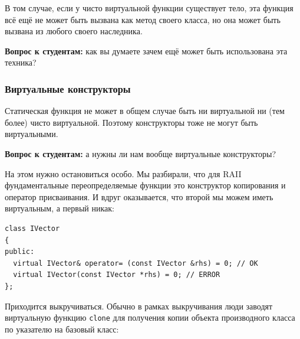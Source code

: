 \documentclass[a4paper,12pt,oneside]{article}
\newif\ifanswers
\begin{document}
В том случае, если у чисто виртуальной функции существует тело, эта функция всё ещё не может быть вызвана как метод своего класса, но она может быть вызвана из любого своего наследника.

\textbf{Вопрос к студентам:} как вы думаете зачем ещё может быть использована эта техника?

\ifanswers
Возможный ответ: для организации разумного поведения по умолчанию, которое наследники должны явно вызывать:

\begin{lstlisting}
class B 
{
public:
  virtual bool f() = 0;
};

bool 
B::f() 
{
  return true;  // this is a good default, but
}               // shouldn't be used blindly

class D : public B 
{
public:
  bool f() 
  {
    return B::f(); // if D wants the default
  }                // behaviour, it has to say so
};
\end{lstlisting}

Но тут возможны и другие варианты: например выдать лучшее сообщение об ошибке чем компилятор и выйти.
\fi

\subsubsection{Виртуальные конструкторы}

Статическая функция не может в общем случае быть ни виртуальной ни (тем более) чисто виртуальной. Поэтому конструкторы тоже не могут быть виртуальными.

\textbf{Вопрос к студентам:} а нужны ли нам вообще виртуальные конструкторы?

\ifanswers
Правильный ответ: да очень нужны. Скажем виртуальный конструктор копирования позволил бы создать в явном виде объект производного класса по указателю на объект базового класса
\fi

На этом нужно остановиться особо. Мы разбирали, что для RAII фундаментальные переопределяемые функции это конструктор копирования и оператор присваивания. И вдруг оказывается, что второй мы можем иметь виртуальным, а первый никак:

\begin{lstlisting}
class IVector
{
public:
  virtual IVector& operator= (const IVector &rhs) = 0; // OK
  virtual IVector(const IVector *rhs) = 0; // ERROR
};
\end{lstlisting}

Приходится выкручиваться. Обычно в рамках выкручивания люди заводят виртуальную функцию \lstinline!clone! для получения копии объекта производного класса по указателю на базовый класс:
\end{document}
